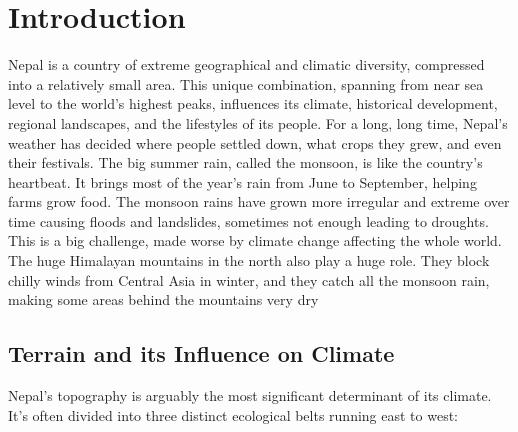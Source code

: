 \chapter{Introduction}

Nepal is a country of extreme geographical and climatic diversity, compressed into a relatively small area. This unique combination, spanning from near sea level to the world's highest peaks, influences its climate, historical development, regional landscapes, and the lifestyles of its people. For a long, long time, Nepal's weather has decided where people settled down, what crops they grew, and even their festivals. The big summer rain, called the monsoon, is like the country's heartbeat. It brings most of the year's rain from June to September, helping farms grow food. The monsoon rains have grown more irregular and extreme over time causing floods and landslides, sometimes not enough leading to droughts. This is a big challenge, made worse by climate change affecting the whole world. The huge Himalayan mountains in the north also play a huge role. They block chilly winds from Central Asia in winter, and they catch all the monsoon rain, making some areas behind the mountains very dry

\section*{Terrain and its Influence on Climate}

Nepal's topography is arguably the most significant determinant of its climate. It's often divided into three distinct ecological belts running east to west:

